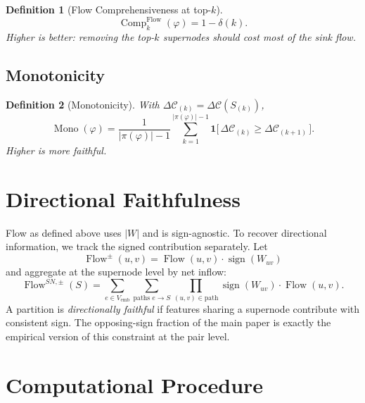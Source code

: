 \documentclass[11pt]{article}
\DeclareMathOperator{\Flow}{Flow}
\DeclareMathOperator{\Comp}{Comp}
\DeclareMathOperator{\Mono}{Mono}
\DeclareMathOperator{\sign}{sign}
\newtheorem{definition}{Definition}
\begin{document}
\begin{definition}[Flow Comprehensiveness at top-$k$]\label{def:flow-comp}
\begin{equation}
\Comp_k^{\Flow}(\varphi) = 1 - \delta(k).
\label{eq:flow-comp}
\end{equation}
Higher is better: removing the top-$k$ supernodes should cost most
of the sink flow.
\end{definition}

\subsection{Monotonicity}

\begin{definition}[Monotonicity]\label{def:mono}
With $\Delta \mathcal{C}_{(k)} = \Delta \mathcal{C}(S_{(k)})$,
\begin{equation}
\Mono(\varphi)
= \frac{1}{|\pi(\varphi)| - 1}
  \sum_{k=1}^{|\pi(\varphi)| - 1}
  \mathbf{1}\bigl[\, \Delta \mathcal{C}_{(k)} \ge \Delta \mathcal{C}_{(k+1)} \,\bigr].
\label{eq:mono}
\end{equation}
Higher is more faithful.
\end{definition}

\section{Directional Faithfulness}\label{sec:directional}

Flow as defined above uses $|W|$ and is sign-agnostic. To recover
directional information, we track the signed contribution
separately. Let
\begin{equation}
\Flow^{\pm}(u, v) = \Flow(u, v) \cdot \sign(W_{uv})
\label{eq:flow-signed}
\end{equation}
and aggregate at the supernode level by net inflow:
\begin{equation}
\Flow^{SN, \pm}(S) = \sum_{e \in V_{\text{emb}}} \sum_{\text{paths } e \to S}
\prod_{(u, v) \in \text{path}} \sign(W_{uv}) \cdot \Flow(u, v).
\end{equation}
A partition is \emph{directionally faithful} if features sharing a
supernode contribute with consistent sign. The opposing-sign
fraction of the main paper is exactly the empirical version of this
constraint at the pair level.

\section{Computational Procedure}\label{sec:procedure}
\end{document}
